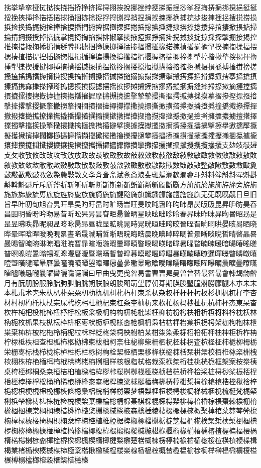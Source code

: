 挘挙挚挛挜挝挞挟挠挡挢挣挤挥挦挧挨挩挪挫挬挭挮振挰挱挲挳挴挵挶挷挸挹挺挻挼挽挾挿捀捁捂捃捄捅捆捇捈捉捊捋捌捍捎捏捐捑捒捓捔捕捖捗捘捙捚捛捜捝捞损捠捡换捣捤捥捦捧捨捩捪捫捬捭据捯捰捱捲捳捴捵捶捷捸捹捺捻捼捽捾捿掀掁掂掃掄掅掆掇授掉掊掋掌掍掎掏掐掑排掓掔掕掖掗掘掙掚掛掜掝掞掟掠採探掣掤接掦控推掩措掫掬掭掮掯掰掱掲掳掴掵掶掷掸掹掺掻掼掽掾掿揀揁揂揃揄揅揆揇揈揉揊揋揌揍揎描提揑插揓揔揕揖揗揘揙揚換揜揝揞揟揠握揢揣揤揥揦揧揨揩揪揫揬揭揮揯揰揱揲揳援揵揶揷揸揹揺揻揼揽揾揿搀搁搂搃搄搅搆搇搈搉搊搋搌損搎搏搐搑搒搓搔搕搖搗搘搙搚搛搜搝搞搟搠搡搢搣搤搥搦搧搨搩搪搫搬搭搮搯搰搱搲搳搴搵搶搷搸搹携搻搼搽搾搿摀摁摂摃摄摅摆摇摈摉摊摋摌摍摎摏摐摑摒摓摔摕摖摗摘摙摚摛摜摝摞摟摠摡摢摣摤摥摦摧摨摩摪摫摬摭摮摯摰摱摲摳摴摵摶摷摸摹摺摻摼摽摾摿撀撁撂撃撄撅撆撇撈撉撊撋撌撍撎撏撐撑撒撓撔撕撖撗撘撙撚撛撜撝撞撟撠撡撢撣撤撥撦撧撨撩撪撫撬播撮撯撰撱撲撳撴撵撶撷撸撹撺撻撼撽撾撿擀擁擂擃擄擅擆擇擈擉擊擋擌操擎擏擐擑擒擓擔擕擖擗擘擙據擛擜擝擞擟擠擡擢擣擤擥擦擧擨擩擪擫擬擭擮擯擰擱擲擳擴擵擶擷擸擹擺擻擼擽擾擿攀攁攂攃攄攅攆攇攈攉攊攋攌攍攎攏攐攑攒攓攔攕攖攗攘攙攚攛攜攝攞攟攠攡攢攣攤攥攦攧攨攩攪攫攬攭攮支攰攱攲攳攴攵收攷攸改攺攻攼攽放政敀敁敂敃敄故敆敇效敉敊敋敌敍敎敏敐救敒敓敔敕敖敗敘教敚敛敜敝敞敟敠敡敢散敤敥敦敧敨敩敪敫敬敭敮敯数敱敲敳整敵敶敷數敹敺敻敼敽敾敿斀斁斂斃斄斅斆文斈斉斊斋斌斍斎斏斐斑斒斓斔斕斖斗斘料斚斛斜斝斞斟斠斡斢斣斤斥斦斧斨斩斪斫斬断斮斯新斱斲斳斴斵斶斷斸方斺斻於施斾斿旀旁旂旃旄旅旆旇旈旉旊旋旌旍旎族旐旑旒旓旔旕旖旗旘旙旚旛旜旝旞旟无旡既旣旤日旦旧旨早旪旫旬旭旮旯旰旱旲旳旴旵时旷旸旹旺旻旼旽旾旿昀昁昂昃昄昅昆昇昈昉昊昋昌昍明昏昐昑昒易昔昕昖昗昘昙昚昛昜昝昞星映昡昢昣昤春昦昧昨昩昪昫昬昭昮是昰昱昲昳昴昵昶昷昸昹昺昻昼昽显昿晀晁時晃晄晅晆晇晈晉晊晋晌晍晎晏晐晑晒晓晔晕晖晗晘晙晚晛晜晝晞晟晠晡晢晣晤晥晦晧晨晩晪晫晬晭普景晰晱晲晳晴晵晶晷晸晹智晻晼晽晾晿暀暁暂暃暄暅暆暇暈暉暊暋暌暍暎暏暐暑暒暓暔暕暖暗暘暙暚暛暜暝暞暟暠暡暢暣暤暥暦暧暨暩暪暫暬暭暮暯暰暱暲暳暴暵暶暷暸暹暺暻暼暽暾暿曀曁曂曃曄曅曆曇曈曉曊曋曌曍曎曏曐曑曒曓曔曕曖曗曘曙曚曛曜曝曞曟曠曡曢曣曤曥曦曧曨曩曪曫曬曭曮曯曰曱曲曳更曵曶曷書曹曺曻曼曽曾替最朁朂會朄朅朆朇月有朊朋朌服朎朏朐朑朒朓朔朕朖朗朘朙朚望朜朝朞期朠朡朢朣朤朥朦朧木朩未末本札朮术朰朱朲朳朴朵朶朷朸朹机朻朼朽朾朿杀杁杂权杄杅杆杇杈杉杊杋杌杍李杏材村杒杓杔杕杖杗杘杙杚杛杜杝杞束杠条杢杣杤来杦杧杨杩杪杫杬杭杮杯杰東杲杳杴杵杶杷杸杹杺杻杼杽松板枀极枂枃构枅枆枇枈枉枊枋枌枍枎枏析枑枒枓枔枕枖林枘枙枚枛果枝枞枟枠枡枢枣枤枥枦枧枨枩枪枫枬枭枮枯枰枱枲枳枴枵架枷枸枹枺枻枼枽枾枿柀柁柂柃柄柅柆柇柈柉柊柋柌柍柎柏某柑柒染柔柕柖柗柘柙柚柛柜柝柞柟柠柡柢柣柤查柦柧柨柩柪柫柬柭柮柯柰柱柲柳柴柵柶柷柸柹柺査柼柽柾柿栀栁栂栃栄栅栆标栈栉栊栋栌栍栎栏栐树栒栓栔栕栖栗栘栙栚栛栜栝栞栟栠校栢栣栤栥栦栧栨栩株栫栬栭栮栯栰栱栲栳栴栵栶样核根栺栻格栽栾栿桀桁桂桃桄桅框桇案桉桊桋桌桍桎桏桐桑桒桓桔桕桖桗桘桙桚桛桜桝桞桟桠桡桢档桤桥桦桧桨桩桪桫桬桭桮桯桰桱桲桳桴桵桶桷桸桹桺桻桼桽桾桿梀梁梂梃梄梅梆梇梈梉梊梋梌梍梎梏梐梑梒梓梔梕梖梗梘梙梚梛梜條梞梟梠梡梢梣梤梥梦梧梨梩梪梫梬梭梮梯械梱梲梳梴梵梶梷梸梹梺梻梼梽梾梿检棁棂棃棄棅棆棇棈棉棊棋棌棍棎棏棐棑棒棓棔棕棖棗棘棙棚棛棜棝棞棟棠棡棢棣棤棥棦棧棨棩棪棫棬棭森棯棰棱棲棳棴棵棶棷棸棹棺棻棼棽棾棿椀椁椂椃椄椅椆椇椈椉椊椋椌植椎椏椐椑椒椓椔椕椖椗椘椙椚椛検椝椞椟椠椡椢椣椤椥椦椧椨椩椪椫椬椭椮椯椰椱椲椳椴椵椶椷椸椹椺椻椼椽椾椿楀楁楂楃楄楅楆楇楈楉楊楋楌楍楎楏楐楑楒楓楔楕楖楗楘楙楚楛楜楝楞楟楠楡楢楣楤楥楦楧楨楩楪楫楬業楮楯楰楱楲楳楴極楶楷楸楹楺楻楼楽楾楿榀榁概榃榄榅榆榇榈榉榊榋榌榍榎榏榐榑榒榓榔榕榖榗榘榙榚榛